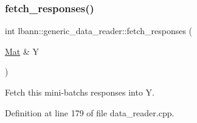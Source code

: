 \subsubsection{\texorpdfstring{fetch\+\_\+responses()}{fetch\_responses()}}
{\footnotesize\ttfamily int lbann\+::generic\+\_\+data\+\_\+reader\+::fetch\+\_\+responses (\begin{DoxyParamCaption}\item[{\hyperlink{base_8hpp_a68f11fdc31b62516cb310831bbe54d73}{Mat} \&}]{Y }\end{DoxyParamCaption})\hspace{0.3cm}{\ttfamily [virtual]}}



Fetch this mini-\/batch\textquotesingle{}s responses into Y. 



Definition at line 179 of file data\+\_\+reader.\+cpp.


